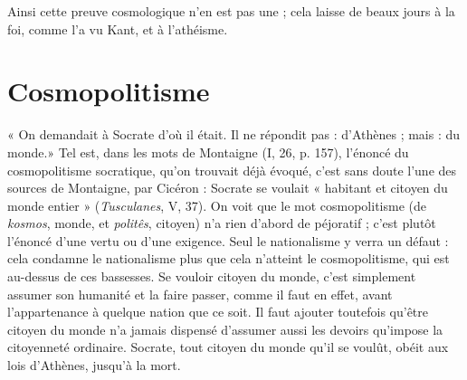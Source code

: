 Ainsi cette preuve cosmologique n’en est pas une ; cela laisse de beaux jours
à la foi, comme l’a vu Kant, et à l’athéisme.

\section{Cosmopolitisme}
« On demandait à Socrate d’où il était. Il ne répondit
pas : d'Athènes ; mais : du monde.» Tel est,
dans les mots de Montaigne (I, 26, p. 157), l'énoncé du cosmopolitisme socratique,
qu’on trouvait déjà évoqué, c’est sans doute l’une des sources de Montaigne,
par Cicéron : Socrate se voulait « habitant et citoyen du monde entier »
({\it Tusculanes}, V, 37). On voit que le mot cosmopolitisme (de {\it kosmos}, monde, et
{\it politês}, citoyen) n’a rien d’abord de péjoratif ; c’est plutôt l’énoncé d’une vertu
ou d’une exigence. Seul le nationalisme y verra un défaut : cela condamne le
nationalisme plus que cela n’atteint le cosmopolitisme, qui est au-dessus de ces
bassesses. Se vouloir citoyen du monde, c’est simplement assumer son humanité
et la faire passer, comme il faut en effet, avant l’appartenance à quelque
nation que ce soit. Il faut ajouter toutefois qu'être citoyen du monde n’a jamais
dispensé d’assumer aussi les devoirs qu’impose la citoyenneté ordinaire.
Socrate, tout citoyen du monde qu’il se voulût, obéit aux lois d'Athènes,
jusqu’à la mort.

